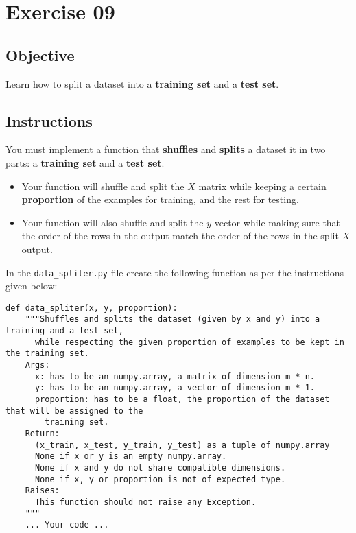 \chapter{Exercise 09}

\newpage
{}
\makeheaderfilesforbidden


\section*{Objective}
Learn how to split a dataset into a \textbf{training set} and a \textbf{test set}.

\section*{Instructions}
You must implement a function that \textbf{shuffles} and \textbf{splits} a dataset it in two parts: a \textbf{training set} and a \textbf{test set}.
\begin{itemize}
  \item Your function will shuffle and split the $X$ matrix while keeping a certain \textbf{proportion} of the examples for training, and the rest for testing.
  \item Your function will also shuffle and split the $y$ vector while making sure that the order of the rows in the output match the order of the rows in the split $X$ output.
\end{itemize}


In the \texttt{data\_spliter.py} file create the following function as per the instructions given below:

\begin{verbatim}
def data_spliter(x, y, proportion):
    """Shuffles and splits the dataset (given by x and y) into a training and a test set,
      while respecting the given proportion of examples to be kept in the training set.
    Args:
      x: has to be an numpy.array, a matrix of dimension m * n.
      y: has to be an numpy.array, a vector of dimension m * 1.
      proportion: has to be a float, the proportion of the dataset that will be assigned to the
        training set.
    Return:
      (x_train, x_test, y_train, y_test) as a tuple of numpy.array
      None if x or y is an empty numpy.array.
      None if x and y do not share compatible dimensions.
      None if x, y or proportion is not of expected type.
    Raises:
      This function should not raise any Exception.
    """
    ... Your code ...
\end{verbatim}

